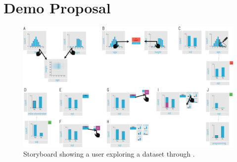 \section{Demo Proposal}
\label{sec:scenarios}

\begin{figure}[ht]
\center
\includegraphics[width=\textwidth]{figures/storyboard.pdf}
\caption{Storyboard showing a user exploring a dataset through \system{}.}
\label{fig:sb}
\end{figure}

